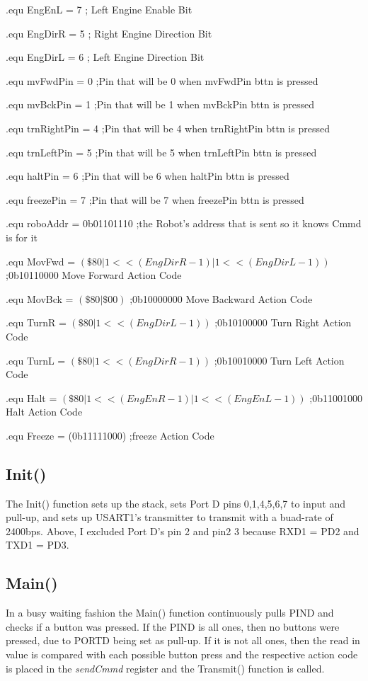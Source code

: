 \documentclass[12pt,letterpaper]{article}
\begin{document}
	.equ	EngEnL = 7				\hfill; Left Engine Enable Bit

	.equ	EngDirR = 5				\hfill; Right Engine Direction Bit

	.equ	EngDirL = 6				\hfill; Left Engine Direction Bit
	
	.equ	mvFwdPin = 0		\hfill	;Pin that will be 0 when mvFwdPin bttn is pressed

	.equ	mvBckPin = 1		\hfill	;Pin that will be 1 when mvBckPin bttn is pressed
	
	.equ	trnRightPin = 4		\hfill	;Pin that will be 4 when trnRightPin bttn is pressed
	
	.equ	trnLeftPin = 5		\hfill	;Pin that will be 5 when trnLeftPin bttn is pressed

	.equ	haltPin = 6			\hfill	;Pin that will be 6 when haltPin bttn is pressed

	.equ	freezePin = 7		\hfill	;Pin that will be 7 when freezePin bttn is pressed
	
	.equ 	roboAddr = 0b01101110 \hfill	;the Robot's address that is sent so it knows Cmmd is for it


	.equ	MovFwd =  $(\$80|1<<(EngDirR-1)|1<<(EngDirL-1))$\hfill	;0b10110000 Move Forward Action Code

	.equ	MovBck =  $(\$80|\$00)$							\hfill	;0b10000000 Move Backward Action Code

	.equ	TurnR =   $(\$80|1<<(EngDirL-1))$				\hfill	;0b10100000 Turn Right Action Code

	.equ	TurnL =  $ (\$80|1<<(EngDirR-1))$				\hfill	;0b10010000 Turn Left Action Code

	.equ	Halt =    $(\$80|1<<(EngEnR-1)|1<<(EngEnL-1))$	\hfill	;0b11001000 Halt Action Code

	.equ	Freeze =  (0b11111000)							\hfill ;freeze Action Code
	


\subsection{Init()}
	The Init() function sets up the stack, sets Port D pins 0,1,4,5,6,7 to input and pull-up, and sets up USART1's transmitter to transmit with a buad-rate of 2400bps.
	Above, I excluded Port D's pin 2 and pin2 3 because RXD1 = PD2 and TXD1 = PD3.
	
\subsection{Main()}
	In a busy waiting fashion the Main() function continuously pulls PIND and checks if a button was pressed.
	If the PIND is all ones, then no buttons were pressed, due to PORTD being set as pull-up.
	If it is not all ones, then the read in value is compared with each possible button press and the respective action code is placed in the \textit{sendCmmd} register and the Transmit() function is called.
	
\end{document}

